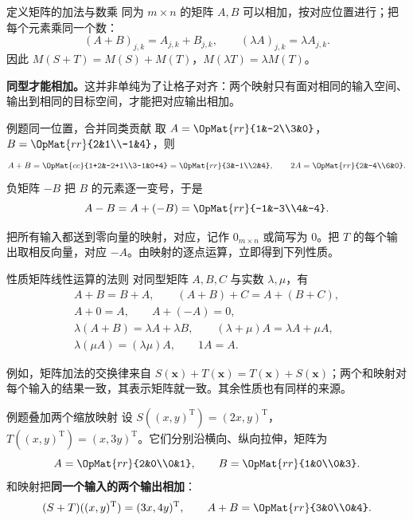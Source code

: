 \documentclass[a4paper,12pt,twoside,openany,fontset=none]{ctexbook}
\newenvironment{property}[1][]{\begin{thmBox}{性质}{#1}}{\end{thmBox}}
\newcounter{definition}[chapter]
\newenvironment{definition}[1][]{\begin{defBox}{定义}{#1}}{\end{defBox}}
\newcounter{example}[chapter]
\newenvironment{example}[1][]{\begin{exBox}{例题}{#1}}{\end{exBox}}
\numberwithin{equation}{chapter}
\begin{document}
\begin{definition}[矩阵的加法与数乘]
同为 $m\times n$ 的矩阵 $A,B$ 可以相加，按对应位置进行；把每个元素乘同一个数：
\[
 (A+B)_{j,k}=A_{j,k}+B_{j,k},\qquad
 (\lambda A)_{j,k}=\lambda A_{j,k}.
\]
因此 $M(S+T)=M(S)+M(T)$，$M(\lambda T)=\lambda M(T)$。
\end{definition}

\textbf{同型才能相加。}这并非单纯为了让格子对齐：两个映射只有面对相同的输入空间、输出到相同的目标空间，才能把对应输出相加。

\begin{example}[同一位置，合并同类贡献]
取 $A=\OpMat{rr}{1&-2\\3&0}$，$B=\OpMat{rr}{2&1\\-1&4}$，则
\[
 A+B=\OpMat{cc}{1+2&-2+1\\3-1&0+4}
 =\OpMat{rr}{3&-1\\2&4},\qquad
 2A=\OpMat{rr}{2&-4\\6&0}.
\]
负矩阵 $-B$ 把 $B$ 的元素逐一变号，于是
\[
 A-B=A+(-B)=\OpMat{rr}{-1&-3\\4&-4}.
\]
\end{example}

把所有输入都送到零向量的映射，对应，记作 $0_{m\times n}$ 或简写为 $0$。把 $T$ 的每个输出取相反向量，对应 $-A$。由映射的逐点运算，立即得到下列性质。

\begin{property}[矩阵线性运算的法则]
对同型矩阵 $A,B,C$ 与实数 $\lambda,\mu$，有
\[
\begin{gathered}
 A+B=B+A,\qquad (A+B)+C=A+(B+C),\\
 A+0=A,\qquad A+(-A)=0,\\
 \lambda(A+B)=\lambda A+\lambda B,\qquad
 (\lambda+\mu)A=\lambda A+\mu A,\\
 \lambda(\mu A)=(\lambda\mu)A,\qquad 1A=A.
\end{gathered}
\]
\end{property}

例如，矩阵加法的交换律来自 $S(\boldsymbol x)+T(\boldsymbol x)=T(\boldsymbol x)+S(\boldsymbol x)$；两个和映射对每个输入的结果一致，其表示矩阵就一致。其余性质也有同样的来源。

\begin{example}[叠加两个缩放映射]
设 $S((x,y)^{\mathrm T})=(2x,y)^{\mathrm T}$，$T((x,y)^{\mathrm T})=(x,3y)^{\mathrm T}$。它们分别沿横向、纵向拉伸，矩阵为
\[
 A=\OpMat{rr}{2&0\\0&1},\qquad B=\OpMat{rr}{1&0\\0&3}.
\]
和映射把\textbf{同一个输入的两个输出相加}：
\[
 (S+T)((x,y)^{\mathrm T})=(3x,4y)^{\mathrm T},\qquad
 A+B=\OpMat{rr}{3&0\\0&4}.
\]
\end{example}
\end{document}
